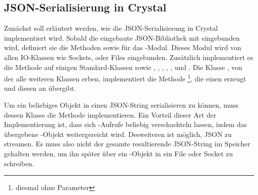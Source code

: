 \subsection{JSON-Serialisierung in Crystal}
\label{ssec:bj_json_serialisierung_in_crystal}

Zunächst soll erläutert werden, wie die JSON-Serialisierung in Crystal
implementiert wird.  Sobald die eingebaute JSON-Bibliothek mit  eingebunden wird, definiert sie die Methoden  sowie
 für das -Modul.  Dieses Modul wird von allen
IO-Klassen wie Sockets, oder Files eingebunden.  Zusätzlich implementiert es
die Methode  auf einigen Standard-Klassen sowie
, , , , ,
 und .  Die Klasse , von der alle weiteren
Klassen erben, implementiert die Methode \footnote{diesmal ohne
Parameter}, die einen  erzeugt und diesen an
 übergibt.

Um ein beliebiges Objekt in einen JSON-String serialisieren zu können, muss
dessen Klasse die Methode  implementieren.  Ein Vorteil
dieser Art der Implementierung ist, dass sich -Aufrufe
beliebig verschachteln lassen, indem das übergebene -Objekt
weitergereicht wird.  Desweiteren ist möglich, JSON zu streamen.  Es muss also
nicht der gesamte resultierende JSON-String im Speicher gehalten werden, um ihn
später über ein -Objekt in ein File oder Socket zu schreiben.
